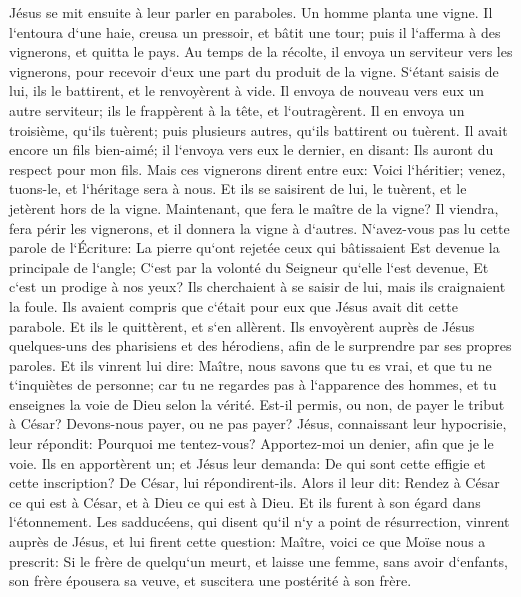 \verse Jésus se mit ensuite à leur parler en paraboles. Un homme planta une vigne. Il l`entoura d`une haie, creusa un pressoir, et bâtit une tour; puis il l`afferma à des vignerons, et quitta le pays. 
\verse Au temps de la récolte, il envoya un serviteur vers les vignerons, pour recevoir d`eux une part du produit de la vigne. 
\verse S`étant saisis de lui, ils le battirent, et le renvoyèrent à vide. 
\verse Il envoya de nouveau vers eux un autre serviteur; ils le frappèrent à la tête, et l`outragèrent. 
\verse Il en envoya un troisième, qu`ils tuèrent; puis plusieurs autres, qu`ils battirent ou tuèrent. 
\verse Il avait encore un fils bien-aimé; il l`envoya vers eux le dernier, en disant: Ils auront du respect pour mon fils. 
\verse Mais ces vignerons dirent entre eux: Voici l`héritier; venez, tuons-le, et l`héritage sera à nous. 
\verse Et ils se saisirent de lui, le tuèrent, et le jetèrent hors de la vigne. 
\verse Maintenant, que fera le maître de la vigne? Il viendra, fera périr les vignerons, et il donnera la vigne à d`autres. 
\verse N`avez-vous pas lu cette parole de l`Écriture: La pierre qu`ont rejetée ceux qui bâtissaient Est devenue la principale de l`angle; 
\verse C`est par la volonté du Seigneur qu`elle l`est devenue, Et c`est un prodige à nos yeux? 
\verse Ils cherchaient à se saisir de lui, mais ils craignaient la foule. Ils avaient compris que c`était pour eux que Jésus avait dit cette parabole. Et ils le quittèrent, et s`en allèrent. 
\verse Ils envoyèrent auprès de Jésus quelques-uns des pharisiens et des hérodiens, afin de le surprendre par ses propres paroles. 
\verse Et ils vinrent lui dire: Maître, nous savons que tu es vrai, et que tu ne t`inquiètes de personne; car tu ne regardes pas à l`apparence des hommes, et tu enseignes la voie de Dieu selon la vérité. Est-il permis, ou non, de payer le tribut à César? Devons-nous payer, ou ne pas payer? 
\verse Jésus, connaissant leur hypocrisie, leur répondit: Pourquoi me tentez-vous? Apportez-moi un denier, afin que je le voie. 
\verse Ils en apportèrent un; et Jésus leur demanda: De qui sont cette effigie et cette inscription? De César, lui répondirent-ils. 
\verse Alors il leur dit: Rendez à César ce qui est à César, et à Dieu ce qui est à Dieu. Et ils furent à son égard dans l`étonnement. 
\verse Les sadducéens, qui disent qu`il n`y a point de résurrection, vinrent auprès de Jésus, et lui firent cette question: 
\verse Maître, voici ce que Moïse nous a prescrit: Si le frère de quelqu`un meurt, et laisse une femme, sans avoir d`enfants, son frère épousera sa veuve, et suscitera une postérité à son frère. 
